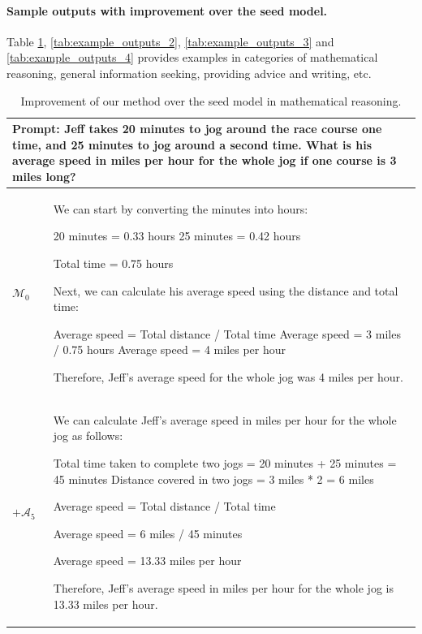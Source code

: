 \paragraph{Sample outputs with improvement over the seed model.} Table \ref{tab:example_outputs_1}, \ref{tab:example_outputs_2}, \ref{tab:example_outputs_3} and \ref{tab:example_outputs_4} provides examples in categories of mathematical reasoning, general information seeking, providing advice and writing, etc.
\begin{table}[t]
\caption{Improvement of our method over the seed model in mathematical reasoning.\label{tab:example_outputs_1}}

  \begin{tabular}{p{1em}l}
    \toprule
    \multicolumn{2}{l}{\begin{minipage}{40em}
\textbf{Prompt:}
 Jeff takes 20 minutes to jog around the race course one time, and 25 minutes to jog around a second time. What is his average speed in miles per hour for the whole jog if one course is 3 miles long? 
  
\end{minipage}} \\ 
     \midrule
    $\mathcal{M}_0$ & \begin{minipage}{40em}
\begin{lmttfont}
        We can start by converting the minutes into hours:

20 minutes = 0.33 hours
25 minutes = 0.42 hours

Total time = 0.75 hours

Next, we can calculate his average speed using the distance and total time:

Average speed = Total distance / Total time
Average speed = 3 miles / 0.75 hours
Average speed = 4 miles per hour

Therefore, Jeff's average speed for the whole jog was 4 miles per hour.
\end{lmttfont}
    \end{minipage} \\
     \midrule  
   $+ \mathcal{A}_5$ & \begin{minipage}{40em}  
\begin{lmttfont}
We can calculate Jeff's average speed in miles per hour for the whole jog as follows:

Total time taken to complete two jogs = 20 minutes + 25 minutes = 45 minutes
Distance covered in two jogs = 3 miles * 2 = 6 miles

Average speed = Total distance / Total time

Average speed = 6 miles / 45 minutes

Average speed = 13.33 miles per hour

Therefore, Jeff's average speed in miles per hour for the whole jog is 13.33 miles per hour.   
\end{lmttfont}   
   \end{minipage}\\
\bottomrule
  \end{tabular}
\end{table}

